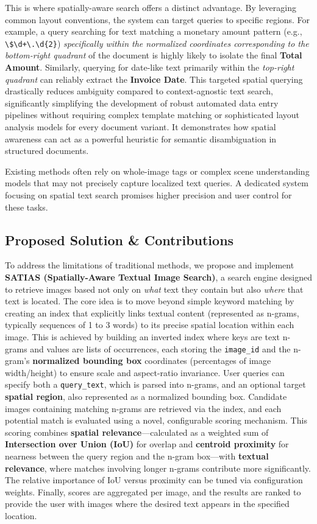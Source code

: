 \documentclass[manuscript,screen]{acmart}
\begin{document}
This is where spatially-aware search offers a distinct advantage. By leveraging common layout conventions, the system can target queries to specific regions. For example, a query searching for text matching a monetary amount pattern (e.g., \verb|\$\d+\.\d{2}|) \textit{specifically within the normalized coordinates corresponding to the bottom-right quadrant} of the document is highly likely to isolate the final \textbf{Total Amount}. Similarly, querying for date-like text primarily within the \textit{top-right quadrant} can reliably extract the \textbf{Invoice Date}. This targeted spatial querying drastically reduces ambiguity compared to context-agnostic text search, significantly simplifying the development of robust automated data entry pipelines without requiring complex template matching or sophisticated layout analysis models for every document variant. It demonstrates how spatial awareness can act as a powerful heuristic for semantic disambiguation in structured documents.

Existing methods often rely on whole-image tags or complex scene understanding models that may not precisely capture localized text queries. A dedicated system focusing on spatial text search promises higher precision and user control for these tasks.

\subsection{Proposed Solution \& Contributions}

To address the limitations of traditional methods, we propose and implement \textbf{SATIAS (Spatially-Aware Textual Image Search)}, a search engine designed to retrieve images based not only on \textit{what} text they contain but also \textit{where} that text is located. The core idea is to move beyond simple keyword matching by creating an index that explicitly links textual content (represented as n-grams, typically sequences of 1 to 3 words) to its precise spatial location within each image. This is achieved by building an inverted index where keys are text n-grams and values are lists of occurrences, each storing the \verb|image_id| and the n-gram's \textbf{normalized bounding box} coordinates (percentages of image width/height) to ensure scale and aspect-ratio invariance. User queries can specify both a \verb|query_text|, which is parsed into n-grams, and an optional target \textbf{spatial region}, also represented as a normalized bounding box. Candidate images containing matching n-grams are retrieved via the index, and each potential match is evaluated using a novel, configurable scoring mechanism. This scoring combines \textbf{spatial relevance}—calculated as a weighted sum of \textbf{Intersection over Union (IoU)} for overlap and \textbf{centroid proximity} for nearness between the query region and the n-gram box—with \textbf{textual relevance}, where matches involving longer n-grams contribute more significantly. The relative importance of IoU versus proximity can be tuned via configuration weights. Finally, scores are aggregated per image, and the results are ranked to provide the user with images where the desired text appears in the specified location.
\end{document}
